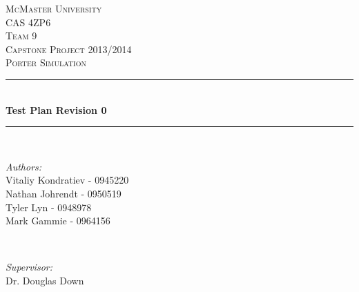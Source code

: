 \documentclass[paper=letter, fontsize=10pt]{scrartcl}
\numberwithin{equation}{section}		%
\numberwithin{figure}{section}			%
\numberwithin{table}{section}				%
\begin{document}
\begin{titlepage}

\newcommand{\HRule}{\rule{\linewidth}{0.5mm}} %
\newcommand{\authors}{\shortstack{Vitaliy Kondratiev,\\Nathan Johrendt,\\Tyler Lyn,\\Mark Gammie}}

\begin{center}
 

\textsc{\LARGE McMaster University}\\[1.5cm] %
\textsc{\Large CAS 4ZP6}\\[0.5cm]
\textsc{\Large Team 9} \\[0.5cm]
\textsc{\Large Capstone Project 2013/2014}\\[0.5cm] %
\textsc{\large Porter Simulation}\\[0.5cm] %


\HRule \\[0.4cm]
{ \huge \bfseries Test Plan Revision 0}\\[0.4cm] %
\HRule \\[1.5cm]
 

\begin{minipage}{0.4\textwidth}
\begin{flushleft} \large
\emph{Authors:}\\
Vitaliy Kondratiev - 0945220\\
Nathan Johrendt - 0950519\\
Tyler Lyn - 0948978\\
Mark Gammie - 0964156
\end{flushleft}
\end{minipage}
~
\begin{minipage}{0.4\textwidth}
\begin{flushright} \large
\emph{Supervisor:} \\
Dr. Douglas Down %
\end{flushright}
\end{minipage}\\[4cm]


\end{center}
\end{titlepage}
\end{document}
